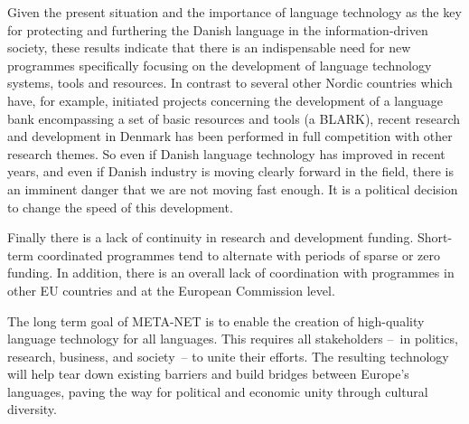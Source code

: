 \documentclass[]{../../metanetpaper}
\begin{document}
\begin{multicols}{2}
Given the present situation and the importance of language technology as the key for protecting and furthering the Danish language in the information-driven society, these results indicate that there is an indispensable need for new programmes specifically focusing on the development of language technology systems, tools and resources. In contrast to several other Nordic countries which have, for example,  initiated projects concerning the development of a language bank encompassing a set of basic resources and tools (a BLARK), recent research and development in Denmark has been performed in full competition with other research themes.  So even if Danish language technology has improved in recent years, and even if Danish industry is moving clearly forward in the field, there is an imminent danger that we are not moving fast enough. It is a political decision to change the speed of this development.

Finally there is a lack of continuity in research and development funding. Short-term coordinated programmes tend to alternate with periods of sparse or zero funding. In addition, there is an overall lack of coordination with programmes in other EU countries and at the European Commission level.

The long term goal of META-NET is to enable the creation of high-quality language technology for all languages. This requires all stakeholders --~in politics, research, business, and society~-- to unite their efforts. The resulting technology will help tear down existing barriers and build bridges between Europe’s languages, paving the way for political and economic unity through cultural diversity. 
\end{multicols}

\clearpage

\end{document}
